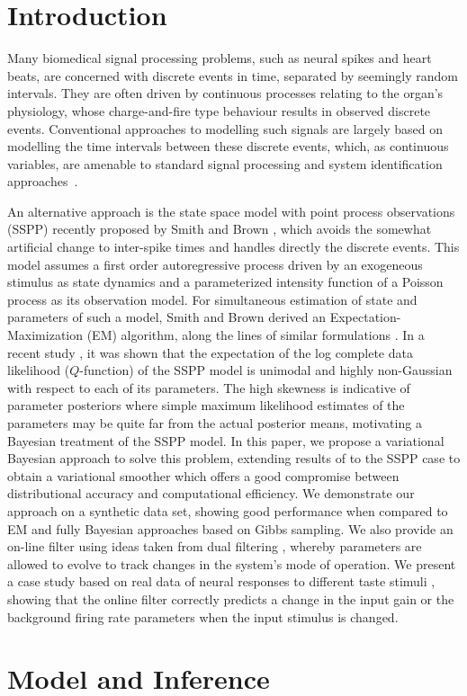 \documentclass{article}
\begin{document}
	\section{Introduction}

Many biomedical signal processing problems, such as neural spikes and  heart beats, are concerned
with discrete events in time, separated by seemingly random intervals.  They are often driven by
continuous processes relating to the organ's physiology, whose charge-and-fire  type behaviour
results in observed discrete  events. Conventional approaches to  modelling such signals are largely
based on modelling the time intervals between these discrete events, which, as continuous variables,
are amenable to standard signal processing and system identification
approaches~\cite{Ivanov_1996,Jolivet_2008}.

An alternative approach is the state space model with point process observations (SSPP) recently
proposed by Smith and Brown \cite{Smith_2003}, which avoids the somewhat artificial change to
inter-spike times and handles directly the discrete events. This model assumes a first order
autoregressive process driven by an exogeneous stimulus as state dynamics and a parameterized
intensity function of a Poisson process as its observation model. For simultaneous estimation of
state and parameters of such a model, Smith and Brown derived an Expectation-Maximization (EM)
algorithm, along the lines of similar formulations \cite{Roweis_1999}.  In a recent study
\cite{Yuan_2010}, it was shown that the expectation of the log complete data likelihood
($Q$-function) of the SSPP model is unimodal and highly non-Gaussian with respect to each of its
parameters. The high skewness is indicative of parameter posteriors where simple maximum likelihood
estimates of the parameters may be quite far from the actual posterior means, motivating a Bayesian
treatment of the SSPP model. In this paper, we propose a variational Bayesian approach to solve this
problem, extending results of \cite{Beal_2003b} to the SSPP case to obtain a variational smoother
which offers a good compromise between distributional accuracy and computational efficiency. We
demonstrate our approach on a synthetic data set, showing good performance when compared to EM and
fully Bayesian approaches based on Gibbs sampling. We also provide an on-line filter using ideas
taken from dual filtering \cite{Haykin_2001}, whereby parameters are allowed to evolve to track
changes in the system's mode of operation. We present a case study based on real data of neural
responses to different taste stimuli \cite{Lorenzo_2003}, showing that the online filter correctly
predicts a change in the input gain or the background firing rate parameters when the input stimulus
is changed.  \section{Model and Inference}
\end{document}

